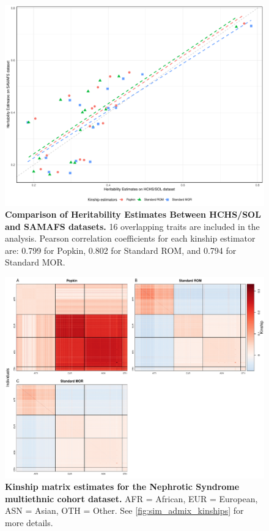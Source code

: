 \documentclass[11pt]{article}
\begin{document}
\begin{figure}[bp!]
  \centering
  \includegraphics[width=\textwidth]{data/hchs_t2d_compare.pdf}
  \caption{
    {\bf Comparison of Heritability Estimates Between HCHS/SOL and SAMAFS datasets.} 16 overlapping traits are included in the analysis.
    Pearson correlation coefficients for each kinship estimator are: 0.799 for Popkin, 0.802 for Standard ROM, and 0.794 for Standard MOR.
    }
  \label{fig:hchs_t2d_compare}
\end{figure}



\begin{figure}[bp!]
  \centering
  \includegraphics[width=\textwidth]{data/SFig_NS_sex_array_kinships.pdf}
  \caption{
    {\bf Kinship matrix estimates for the Nephrotic Syndrome multiethnic cohort dataset.} AFR = African, EUR = European, ASN = Asian, OTH = Other.
    See \cref{fig:sim_admix_kinships} for more details.
    }
  \label{fig:NS_kinships}
\end{figure}
\end{document}

